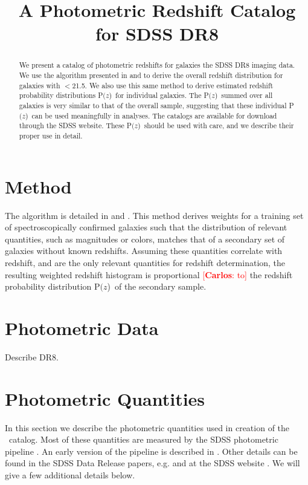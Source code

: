\documentclass[preprint]{aastex}
\newcommand{\rmax}{21.5}
\newcommand{\pofz}{P$(z$)}
\newcommand{\cc}[1]{\textcolor{red}{[{\bf Carlos}: #1]}}
\begin{document}
\title{A Photometric Redshift Catalog for SDSS DR8}



\begin{abstract}

We present a catalog of photometric redshifts for galaxies the SDSS DR8 imaging
data.  We use the algorithm presented in \citet{LimaPhotoz08} and
\citet{CunhaPhotoz09} to derive the overall redshift distribution for galaxies
with \rmag$ < $\rmax.  We also use this same method to derive estimated
redshift probability distributions \pofz\ for individual galaxies.  The \pofz\
summed over all galaxies is very similar to that of the overall sample,
suggesting that these individual \pofz\ can be used meaningfully in analyses.
The catalogs are available for download through the SDSS website.  These \pofz\
should be used with care, and we describe their proper use in detail.

\end{abstract}

\section{Method} \label{sec:method}

The algorithm is detailed in \citet{LimaPhotoz08} and \citet{CunhaPhotoz09}.
This method derives weights for a training set of spectroscopically confirmed
galaxies such that the distribution of relevant quantities, such as magnitudes
or colors, matches that of a secondary set of galaxies without known redshifts.
Assuming these quantities correlate with redshift, and are the only relevant
quantities for redshift determination, the resulting weighted redshift
histogram is proportional \cc{to} the redshift probability distribution \pofz\ of the
secondary sample. 


\section{Photometric Data}
Describe DR8.

\section{Photometric Quantities} \label{sec:photo}

In this section we describe the photometric quantities used in creation of the
\photoz\ catalog.  Most of these quantities are measured by the SDSS
photometric pipeline \photo. An early version of the pipeline is described in
\citet{LuptonADASS01}.  Other details can be found in the SDSS Data Release
papers, e.g. \citet{dr4} and at the SDSS website \citep{sdssorg}.  We will give
a few additional details below.
\end{document}
